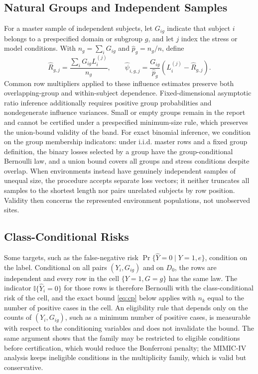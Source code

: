 \documentclass[twoside,11pt]{article}
\begin{document}
\subsection{Natural Groups and Independent Samples}
\label{sec:natural-groups}
For a master sample of independent subjects, let $G_{ig}$ indicate that subject $i$ belongs
to a prespecified domain or subgroup $g$, and let $j$ index the stress or model conditions.
With $n_g=\sum_iG_{ig}$ and $\widehat p_g=n_g/n$, define
\begin{equation}
\widehat R_{g,j}=\frac{\sum_iG_{ig}L_i^{(j)}}{n_g},\qquad
\widehat\psi_{i,g,j}=\frac{G_{ig}}{\widehat p_g}(L_i^{(j)}-\widehat R_{g,j}).
\label{eq:group}
\end{equation}
Common row multipliers applied to these influence estimates preserve both overlapping-group
and within-subject dependence. Fixed-dimensional asymptotic ratio inference additionally
requires positive group probabilities and nondegenerate influence variances. Small or empty
groups remain in the report and cannot be certified under a prespecified minimum-size rule,
which preserves the union-bound validity of the band. For exact binomial inference, we condition on the group membership indicators: under i.i.d.
master rows and a fixed group definition, the binary losses selected by a group have the
group-conditional Bernoulli law, and a union bound covers all groups and stress conditions
despite overlap. When environments instead have genuinely independent samples of unequal
size, the procedure accepts separate loss vectors; it neither truncates all samples to the
shortest length nor pairs unrelated subjects by row position. Validity then concerns the
represented environment populations, not unobserved sites.

\subsection{Class-Conditional Risks}
\label{sec:classcond}
Some targets, such as the false-negative risk $\Pr\{\widehat Y=0\mid Y=1,e\}$, condition on
the label. Conditional on all pairs $(Y_i,G_{ig})$ and on $D_0$, the rows are independent and
every row in the cell $\{Y=1,G=g\}$ has the same law. The indicator $\mathbb
I\{\widehat Y_i=0\}$ for those rows is therefore Bernoulli with the class-conditional risk of
the cell, and the exact bound \eqref{eq:cp} below applies with $n_k$ equal to the number of
positive cases in the cell. An eligibility rule that depends only on the counts of
$(Y_i,G_{ig})$, such as a minimum number of positive cases, is measurable with respect to the
conditioning variables and does not invalidate the bound. The same argument shows that the
family may be restricted to eligible conditions before certification, which would reduce the
Bonferroni penalty; the MIMIC-IV analysis keeps ineligible conditions in the multiplicity
family, which is valid but conservative.
\end{document}
